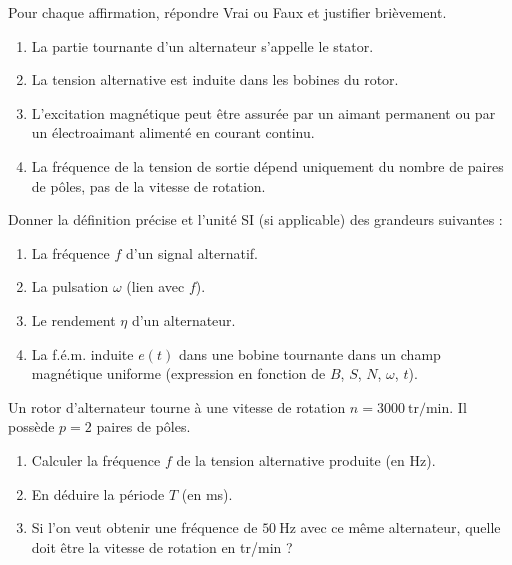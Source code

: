 \documentclass[11pt]{article}
\newcounter{popsec}
\newcounter{popsub}
\newcommand{\courssub}[1]{%
  \stepcounter{popsub}%
  \par\vspace{9pt}\noindent{\popxbold\fontsize{11.5}{13}\selectfont\color{popink}{\color{poporange}\thepopsec.\thepopsub}\hspace{6pt}#1}\par\nopagebreak\vspace{4pt}
}
\begin{document}
\begin{exercice}
Pour chaque affirmation, répondre Vrai ou Faux et justifier brièvement.
\begin{enumerate}
    \item La partie tournante d'un alternateur s'appelle le stator.
    \item La tension alternative est induite dans les bobines du rotor.
    \item L'excitation magnétique peut être assurée par un aimant permanent ou par un électroaimant alimenté en courant continu.
    \item La fréquence de la tension de sortie dépend uniquement du nombre de paires de pôles, pas de la vitesse de rotation.
\end{enumerate}
\end{exercice}

\begin{exercice}
Donner la définition précise et l'unité SI (si applicable) des grandeurs suivantes :
\begin{enumerate}
    \item La fréquence $f$ d'un signal alternatif.
    \item La pulsation $\omega$ (lien avec $f$).
    \item Le rendement $\eta$ d'un alternateur.
    \item La f.é.m. induite $e(t)$ dans une bobine tournante dans un champ magnétique uniforme (expression en fonction de $B$, $S$, $N$, $\omega$, $t$).
\end{enumerate}
\end{exercice}

\begin{exercice}
Un rotor d'alternateur tourne à une vitesse de rotation $n = 3000~\text{tr/min}$. Il possède $p = 2$ paires de pôles.
\begin{enumerate}
    \item Calculer la fréquence $f$ de la tension alternative produite (en Hz).
    \item En déduire la période $T$ (en ms).
    \item Si l'on veut obtenir une fréquence de $50~\text{Hz}$ avec ce même alternateur, quelle doit être la vitesse de rotation en tr/min ?
\end{enumerate}
\end{exercice}

\courssub{Je m'entraîne}
\end{document}
